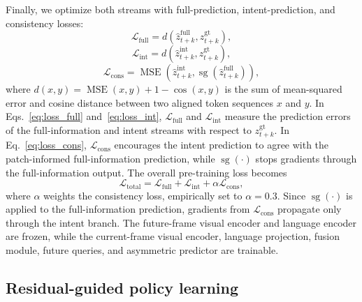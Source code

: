 Finally, we optimize both streams with full-prediction, intent-prediction, and consistency losses:
%
\begin{equation}
\mathcal{L}_{\mathrm{full}}=d\!\left(\hat z^{\mathrm{full}}_{t+k},z^{\mathrm{gt}}_{t+k}\right), \label{eq:loss_full}
\end{equation}
%
\begin{equation}
\mathcal{L}_{\mathrm{int}}=d\!\left(\hat z^{\mathrm{int}}_{t+k},z^{\mathrm{gt}}_{t+k}\right), \label{eq:loss_int}
\end{equation}
%
\begin{equation}
\mathcal{L}_{\mathrm{cons}}
=
\operatorname{MSE}\!\left(
\hat z^{\mathrm{int}}_{t+k},
\operatorname{sg}\!\left(\hat z^{\mathrm{full}}_{t+k}\right)
\right),
\label{eq:loss_cons}
\end{equation}
%
where $d(x,y)=\operatorname{MSE}(x,y)+1-\operatorname{cos}(x,y)$ is the sum of mean-squared error and cosine distance between two aligned token sequences $x$ and $y$. In Eqs.~\ref{eq:loss_full} and~\ref{eq:loss_int}, $\mathcal{L}_{\mathrm{full}}$ and $\mathcal{L}_{\mathrm{int}}$ measure the prediction errors of the full-information and intent streams with respect to $z^{\mathrm{gt}}_{t+k}$. In Eq.~\ref{eq:loss_cons}, $\mathcal{L}_{\mathrm{cons}}$ encourages the intent prediction to agree with the patch-informed full-information prediction, while $\operatorname{sg}(\cdot)$ stops gradients through the full-information output. The overall pre-training loss becomes
%
\begin{equation}
\mathcal{L}_{\mathrm{total}}
=\mathcal{L}_{\mathrm{full}}
+\mathcal{L}_{\mathrm{int}}
+\alpha\mathcal{L}_{\mathrm{cons}},
\label{eq:total}
\end{equation}
%
where $\alpha$ weights the consistency loss, empirically set to $\alpha=0.3$. 
Since $\operatorname{sg}(\cdot)$ is applied to the full-information prediction, gradients from $\mathcal{L}_{\mathrm{cons}}$ propagate only through the intent branch. The future-frame visual encoder and language encoder are frozen, while the current-frame visual encoder, language projection, fusion module, future queries, and asymmetric predictor are trainable.



\subsection{Residual-guided policy learning}
\label{subsec:policy_learning}


